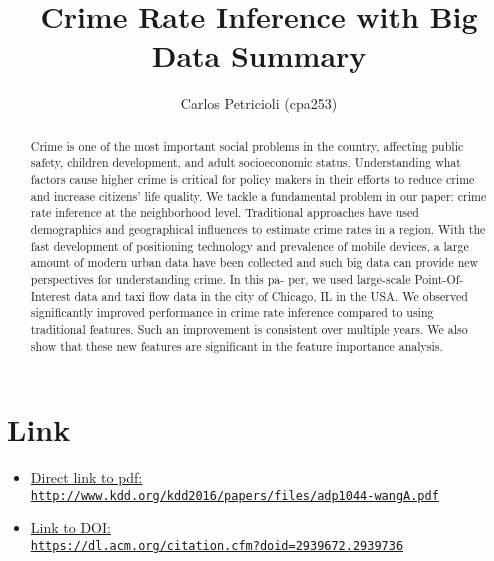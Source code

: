 \documentclass[10pt,letterpaper,english]{article}
\title{Crime Rate Inference with Big Data Summary}
\author{Carlos Petricioli (cpa253)}
\begin{document}
\maketitle

\begin{abstract}
Crime is one of the most important social problems in the country, affecting public safety, children development, and adult socioeconomic status. Understanding what factors cause higher crime is critical for policy makers in their efforts to reduce crime and increase citizens’ life quality. We tackle a fundamental problem in our paper: crime rate inference at the neighborhood level. Traditional approaches have used demographics and geographical influences to estimate crime rates in a region. With the fast development of positioning technology and prevalence of mobile devices, a large amount of modern urban data have been collected and such big data can provide new perspectives for understanding crime. In this pa- per, we used large-scale Point-Of-Interest data and taxi flow data in the city of Chicago, IL in the USA. We observed significantly improved performance in crime rate inference compared to using traditional features. Such an improvement is consistent over multiple years. We also show that these new features are significant in the feature importance analysis.

\end{abstract}

\section*{Link}

\begin{itemize}
\item \href{http://www.kdd.org/kdd2016/papers/files/adp1044-wangA.pdf}{Direct link to pdf:\\ \texttt{http://www.kdd.org/kdd2016/papers/files/adp1044-wangA.pdf}}

\item \href{https://dl.acm.org/citation.cfm?doid=2939672.2939736}{Link to DOI:\\ \texttt{https://dl.acm.org/citation.cfm?doid=2939672.2939736}}
\end{itemize}
\end{document}
